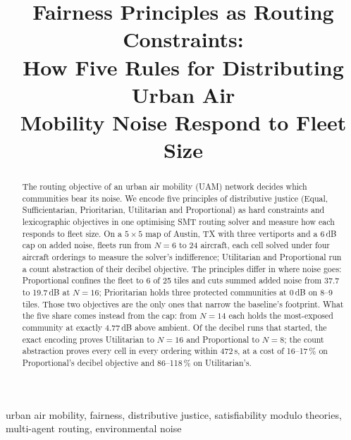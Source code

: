\documentclass[conference]{IEEEtran}
\newcommand{\SI}[2]{#1\,#2}
\newcommand{\dB}{\textup{dB}}
\newcommand{\second}{\textup{s}}
\begin{document}
\title{Fairness Principles as Routing Constraints:\\
How Five Rules for Distributing Urban Air\\
Mobility Noise Respond to Fleet Size}

%
\author{}

\maketitle

\begin{abstract}
The routing objective of an urban air mobility (UAM) network decides which communities
bear its noise. We encode five principles of distributive justice (Equal,
Sufficientarian, Prioritarian, Utilitarian and Proportional) as hard constraints and
lexicographic objectives in one optimising SMT routing solver and measure how each
responds to fleet size. On a $5\times5$ map of Austin, TX with three vertiports and a
\SI{6}{\dB} cap on added noise, fleets run from $N=6$ to 24 aircraft, each cell solved
under four aircraft orderings to measure the solver's indifference; Utilitarian and
Proportional run a count abstraction of their decibel objective. The principles differ in
where noise goes: Proportional confines the fleet to 6 of 25 tiles and cuts summed added
noise from 37.7 to \SI{19.7}{\dB} at $N=16$; Prioritarian holds three protected
communities at \SI{0}{\dB} on 8--9 tiles. Those two objectives are the only ones that
narrow the baseline's footprint. What the five share comes instead from the cap: from
$N=14$ each holds the most-exposed community at exactly \SI{4.77}{\dB} above ambient. Of
the decibel runs that started, the exact encoding proves Utilitarian to $N=16$ and
Proportional to $N=8$; the count abstraction proves every cell in every ordering within
\SI{472}{\second}, at a cost of 16--17\,\% on Proportional's decibel objective and
86--118\,\% on Utilitarian's.
\end{abstract}

\begin{IEEEkeywords}
urban air mobility, fairness, distributive justice, satisfiability modulo theories,
multi-agent routing, environmental noise
\end{IEEEkeywords}









\end{document}
